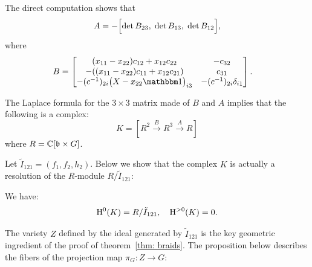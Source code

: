 The direct computation shows that
$$A=-\Bigl[\det B_{23},\;\det B_{13},\;\det B_{12}\Bigr],$$
where
\begin{align*}
B&=
\xbmtr{
(\xoo-\xtt)\excot +\xot\exctt
&
-\excht
\\
-((\xoo-\xtt)\excoo +\xot\excto)
&
\excho
\\
-\civ{2}{i}\zXtv{i3}
&
-\civ{2}{i}\krdlv{i1}
}.
\end{align*}

The Laplace formula for the $3\times 3$ matrix made of $B$ and $A$ implies that the following is a complex:
\begin{equation}\label{eq: reso}
K=[R^2\overset{B}{\longrightarrow} R^3\overset{A}{\longrightarrow} R]
\end{equation}
where $R=\mathbb{C}[\mathfrak{b}\times G]$.

Let $\tilde{I}_{121}=(f_1,f_2,h_2)$.
Below we show that the complex $K$  is actually a resolution of the $R$-module $R/\tilde{I}_{121}$:
\begin{proposition}\label{prop: reso K} We have:
$$\textup{H}^0(K)=R/\tilde{I}_{121},\quad \textup{H}^{>0}(K)=0.$$
\end{proposition}

The variety $Z$ defined by the ideal generated by $\tilde{I}_{121}$ is the key geometric ingredient of the proof of theorem~\ref{thm: braids}.
The proposition below describes the fibers of the projection map $\pi_G: Z\to G$:


